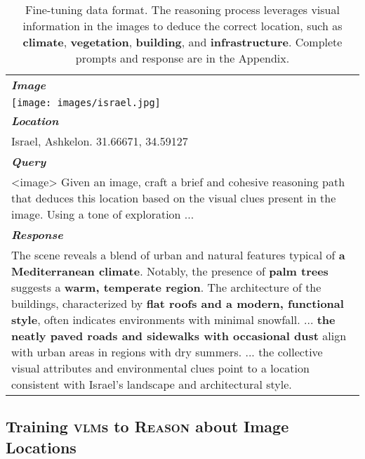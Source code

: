 \begin{table}[t!]
    \centering
    \small
    \begin{tabularx}{\linewidth}{Y}
    \toprule 
        \textit{\textbf{Image}} \\
        \texttt{[image: images/israel.jpg]} \\
        \midrule
        \textit{\textbf{Location}} \\
        Israel, Ashkelon. 31.66671, 34.59127 \\
        \midrule
        \textit{\textbf{Query}} \\
        <image> Given an image, craft a brief and cohesive reasoning path that deduces this location based on the visual clues present in the image. Using a tone of exploration ... \\
        \midrule
        \textit{\textbf{Response}} \\
        The scene reveals a blend of urban and natural features typical of \textcolor{climate}{\textbf{a Mediterranean climate}}. Notably, the presence of \textcolor{vegetation}{\textbf{palm trees}} suggests a \textcolor{climate}{\textbf{warm, temperate region}}. The architecture of the buildings, characterized by \textcolor{building}{\textbf{flat roofs and a modern, functional style}}, often indicates environments with minimal snowfall. ... \textcolor{infrastructure}{\textbf{the neatly paved roads and sidewalks with occasional dust}} align with urban areas in regions with dry summers. ... the collective visual attributes and environmental clues point to a location consistent with Israel's landscape and architectural style.\\
    \bottomrule
    \end{tabularx}
    \caption{Fine-tuning data format. The reasoning process leverages visual information in the images to deduce the correct location, such as \textcolor{climate}{\textbf{climate}}, \textcolor{vegetation}{\textbf{vegetation}}, \textcolor{building}{\textbf{building}}, and \textcolor{infrastructure}{\textbf{infrastructure}}. Complete prompts and response are in the Appendix.}
    \label{tab:sft_data}
\end{table}


\subsection{Training \textsc{vlm}s to \textsc{Reason} about Image Locations}
\label{sec:macro}

